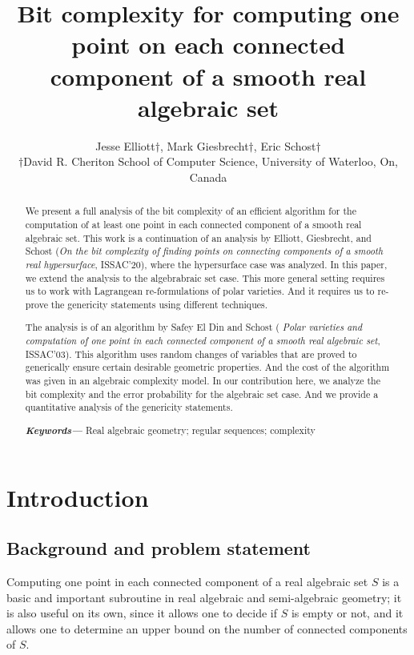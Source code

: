 \documentclass[a4paper]{article}
\title{Bit complexity for computing one point on each connected component of a smooth real algebraic set}
\author{Jesse Elliott$\dagger$, Mark Giesbrecht$\dagger$, Eric Schost$\dagger$  \\
        \small $\dagger$David R. Cheriton School of Computer Science, University of Waterloo, On, Canada \\
}
\date{} %
\providecommand{\keywords}[1]
{
  \small	
  \textbf{\textit{Keywords---}} #1
}
\begin{document}
%
\maketitle
%
\tableofcontents
\newpage
%
%
%
\begin{abstract}
We present a full analysis of the bit complexity of an efficient
  algorithm for the computation of at least one point in each
  connected component of a smooth real algebraic set. This work is a continuation of an analysis by Elliott, Giesbrecht, and Schost ({\em On the bit complexity of finding points on connecting components of a smooth real hypersurface}, ISSAC'20), where the hypersurface case was analyzed. In this paper, we extend the analysis to the algebrabraic set case. This more general setting requires us to work with Lagrangean re-formulations of polar varieties. And it requires us to re-prove the genericity statements using different techniques.  
    
    The analysis is of an algorithm by Safey El Din and Schost ({\em
    Polar varieties and computation of one point in each connected
    component of a smooth real algebraic set}, ISSAC'03). This
  algorithm uses random changes of variables that are proved to
  generically ensure certain desirable geometric properties. And the
  cost of the algorithm was given in an algebraic complexity
  model. In our contribution here, we analyze the bit complexity and the error probability for the algebraic set case. And we provide a
  quantitative analysis of the genericity statements. 

\keywords{Real algebraic geometry; regular sequences; complexity}
\end{abstract}
%
%
%




\section{Introduction}
\label{sec:overview}

%
\subsection{Background and problem statement}
%
Computing one point in each connected component of a real algebraic
set $S$ is a basic and important subroutine in real algebraic and semi-algebraic
geometry; it is also useful on its own, since it allows one to
decide if $S$ is empty or not, and it allows one to determine an upper bound on the number of connected components of $S$.  
\end{document}
